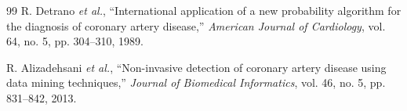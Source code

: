 \documentclass[10pt,conference]{IEEEtran}
\begin{document}
\begin{thebibliography}{99}
R. Detrano \emph{et al.}, ``International application of a new probability algorithm
for the diagnosis of coronary artery disease,''
\emph{American Journal of Cardiology}, vol. 64, no. 5, pp. 304--310, 1989.

R. Alizadehsani \emph{et al.}, ``Non-invasive detection of coronary artery disease
using data mining techniques,''
\emph{Journal of Biomedical Informatics}, vol. 46, no. 5, pp. 831--842, 2013.

\end{thebibliography}
\end{document}
